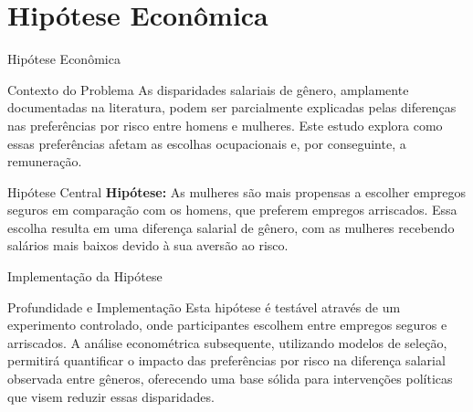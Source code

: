 \documentclass[aspectratio=169, xcolor={dvipsnames}, 10pt, brazil]{beamer}
\begin{document}
\section{Hipótese Econômica}
\begin{frame}{Hipótese Econômica}
    \begin{block}{Contexto do Problema}
        As disparidades salariais de gênero, amplamente documentadas na literatura, podem ser parcialmente explicadas pelas diferenças nas preferências por risco entre homens e mulheres. Este estudo explora como essas preferências afetam as escolhas ocupacionais e, por conseguinte, a remuneração.
    \end{block}
    
    \vspace{0.5cm}
    
    \begin{block}{Hipótese Central}
        \textbf{Hipótese:} As mulheres são mais propensas a escolher empregos seguros em comparação com os homens, que preferem empregos arriscados. Essa escolha resulta em uma diferença salarial de gênero, com as mulheres recebendo salários mais baixos devido à sua aversão ao risco.
    \end{block}
\end{frame}

\begin{frame}{Implementação da Hipótese}
    \begin{block}{Profundidade e Implementação}
        Esta hipótese é testável através de um experimento controlado, onde participantes escolhem entre empregos seguros e arriscados. A análise econométrica subsequente, utilizando modelos de seleção, permitirá quantificar o impacto das preferências por risco na diferença salarial observada entre gêneros, oferecendo uma base sólida para intervenções políticas que visem reduzir essas disparidades.
    \end{block}
\end{frame}

\end{document}
